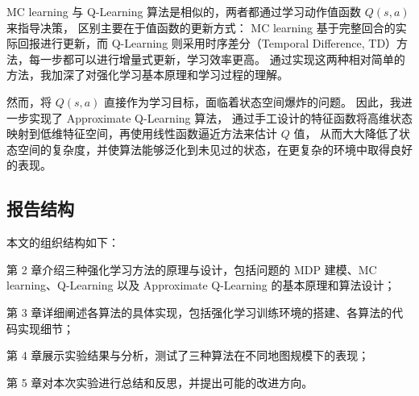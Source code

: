 MC learning 与 Q-Learning 算法是相似的，两者都通过学习动作值函数 $Q(s,a)$ 来指导决策，
区别主要在于值函数的更新方式：
MC learning 基于完整回合的实际回报进行更新，而 Q-Learning 则采用时序差分（Temporal Difference, TD）方法，每一步都可以进行增量式更新，学习效率更高。
通过实现这两种相对简单的方法，我加深了对强化学习基本原理和学习过程的理解。

然而，将 $Q(s,a)$ 直接作为学习目标，面临着状态空间爆炸的问题。
因此，我进一步实现了 Approximate Q-Learning 算法，
通过手工设计的特征函数将高维状态映射到低维特征空间，再使用线性函数逼近方法来估计 $Q$ 值，
从而大大降低了状态空间的复杂度，并使算法能够泛化到未见过的状态，在更复杂的环境中取得良好的表现。


\subsection{报告结构}

本文的组织结构如下：

第 2 章介绍三种强化学习方法的原理与设计，包括问题的 MDP 建模、MC learning、Q-Learning 以及 Approximate Q-Learning 的基本原理和算法设计；

第 3 章详细阐述各算法的具体实现，包括强化学习训练环境的搭建、各算法的代码实现细节；

第 4 章展示实验结果与分析，测试了三种算法在不同地图规模下的表现；

第 5 章对本次实验进行总结和反思，并提出可能的改进方向。